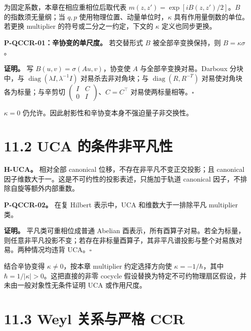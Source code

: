 \documentclass[
  11pt,
  oneside]{book}
\begin{document}
为固定系数，本章在相应重相位后取代表 \(m(z,z')=\exp[iB(z,z')/2]\)。\(B\)
的指数须无量纲；当 \(q,p\) 使用物理位置、动量单位时，\(\kappa\)
具有作用量倒数的单位。若更换 multiplier 的符号或二分之一约定，下文的
\(\kappa\) 定义也同步更换。

\protect\hypertarget{p-qccr-01}{}{}

\textbf{P-QCCR-01：辛协变的单尺度。} 若交替形式 \(B\)
被全部辛变换保持，则 \(B=\kappa\sigma\)。

\textbf{证明。} 写 \(B(u,v)=\sigma(Au,v)\)，协变使 \(A\)
与全部辛变换对易。Darboux 分块中，与
\(\operatorname{diag}(\lambda I,\lambda^{-1}I)\) 对易杀去非对角块；与
\(\operatorname{diag}(R,R^{-T})\) 对易使对角块各为标量；与辛剪切
\(\left(\begin{smallmatrix}I&C\\0&I\end{smallmatrix}\right)\)、\(C=C^\top\)
对易使两标量相等。\(\square\)

\(\kappa=0\) 仍允许。因此射影性和辛协变本身不强迫量子非交换性。

\hypertarget{uca-ux7684ux6761ux4ef6ux975eux5e73ux51e1ux6027}{%
\section{11.2 UCA
的条件非平凡性}\label{uca-ux7684ux6761ux4ef6ux975eux5e73ux51e1ux6027}}

\textbf{H-UCA。} 相对全部 canonical 位移，不存在非平凡不变正交投影；且
canonical 因子维数大于一。这是不可约性的投影表述，只施加于轨道 canonical
因子，不排除自旋等额外内部重数。

\protect\hypertarget{p-qccr-02}{}{}

\textbf{P-QCCR-02。} 在复 Hilbert 表示中，UCA 和维数大于一排除平凡
multiplier 类。

\textbf{证明。} 平凡类可重相位成普通 Abelian
酉表示，所有酉算子对易。若全为标量，则任意非平凡投影不变；若存在非标量酉算子，其非平凡谱投影与整个对易族对易。两种情况均违背
UCA。\(\square\)

结合辛协变得 \(\kappa\ne0\)，按本章 multiplier 约定选择方向使
\(\kappa=-1/\hbar\)，其中 \(\hbar=1/|\kappa|>0\)。这把直接的非零 cocycle
假设替换为特定不可约物理扇区假设，并未由一般对象性无条件证明 UCA
或作用尺度。

\hypertarget{weyl-ux5173ux7cfbux4e0eux4e25ux683c-ccr}{%
\section{11.3 Weyl 关系与严格
CCR}\label{weyl-ux5173ux7cfbux4e0eux4e25ux683c-ccr}}
\end{document}
